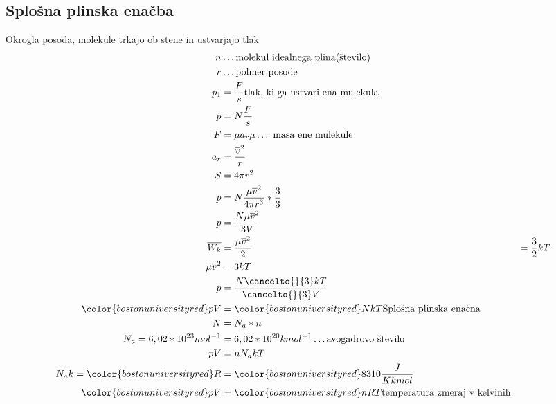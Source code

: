 {\color{indiagreen}\subsection{Splošna plinska enačba}}
Okrogla posoda, molekule trkajo ob stene in ustvarjajo tlak\\
\begin{align*}
	n &\dots \text{molekul idealnega plina(število)}\\
	r &\dots \text{polmer posode}\\
	p_1 &= \frac{F}{s} \text{tlak, ki ga ustvari ena mulekula}\\
	p &= N\frac{F}{s}\\
	F &= \mu a_r \text{$\mu \dots$ masa ene mulekule}\\
	a_r &= \frac{\overline{v}^2}{r}\\
	S &= 4\pi r^2\\
	p &= N\frac{\mu\overline{v}^2}{4\pi r^3} * \frac{3}{3}\\
	p &= \frac{N\mu\overline{v}^2}{3V}\\
	\overline{W_k} &=\frac{\mu\overline{v}^2}{2} &= \frac{3}{2}kT\\
	\mu\overline{v}^2 &= 3kT\\
	p &= \frac{N\cancelto{}{3}kT}{\cancelto{}{3}V}\\
	{\color{bostonuniversityred}pV} &= {\color{bostonuniversityred}NkT}\text{Splošna plinska enačna}\\
	N &=N_a * n\\
	N_a = 6,02*10^{23} mol^{-1} &= 6,02*10^{20} kmol^{-1}\dots \text{avogadrovo število}\\ 
	pV &= n N_a kT\\
	N_a k = {\color{bostonuniversityred}R} &={\color{bostonuniversityred} 8310 \frac{J}{K kmol}}\\
	{\color{bostonuniversityred}pV} &= {\color{bostonuniversityred}nRT}\text{temperatura zmeraj v kelvinih}\\
\end{align*}